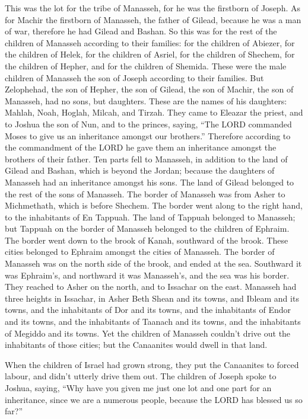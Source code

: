  This was the lot for the tribe of Manasseh, for he was the
firstborn of Joseph. As for Machir the firstborn of Manasseh, the father
of Gilead, because he was a man of war, therefore he had Gilead and
Bashan.  So this was for the rest of the children of
Manasseh according to their families: for the children of Abiezer, for
the children of Helek, for the children of Asriel, for the children of
Shechem, for the children of Hepher, and for the children of Shemida.
These were the male children of Manasseh the son of Joseph according to
their families.  But Zelophehad, the son of Hepher, the son
of Gilead, the son of Machir, the son of Manasseh, had no sons, but
daughters. These are the names of his daughters: Mahlah, Noah, Hoglah,
Milcah, and Tirzah.  They came to Eleazar the priest, and to
Joshua the son of Nun, and to the princes, saying, ``The LORD commanded
Moses to give us an inheritance amongst our brothers.'' Therefore
according to the commandment of the LORD he gave them an inheritance
amongst the brothers of their father.  Ten parts fell to
Manasseh, in addition to the land of Gilead and Bashan, which is beyond
the Jordan;  because the daughters of Manasseh had an
inheritance amongst his sons. The land of Gilead belonged to the rest of
the sons of Manasseh.  The border of Manasseh was from Asher
to Michmethath, which is before Shechem. The border went along to the
right hand, to the inhabitants of En Tappuah.  The land of
Tappuah belonged to Manasseh; but Tappuah on the border of Manasseh
belonged to the children of Ephraim.  The border went down
to the brook of Kanah, southward of the brook. These cities belonged to
Ephraim amongst the cities of Manasseh. The border of Manasseh was on
the north side of the brook, and ended at the sea. 
Southward it was Ephraim's, and northward it was Manasseh's, and the sea
was his border. They reached to Asher on the north, and to Issachar on
the east.  Manasseh had three heights in Issachar, in Asher
Beth Shean and its towns, and Ibleam and its towns, and the inhabitants
of Dor and its towns, and the inhabitants of Endor and its towns, and
the inhabitants of Taanach and its towns, and the inhabitants of Megiddo
and its towns.  Yet the children of Manasseh couldn't drive
out the inhabitants of those cities; but the Canaanites would dwell in
that land.

 When the children of Israel had grown strong, they put the
Canaanites to forced labour, and didn't utterly drive them out.
 The children of Joseph spoke to Joshua, saying, ``Why have
you given me just one lot and one part for an inheritance, since we are
a numerous people, because the LORD has blessed us so far?''


